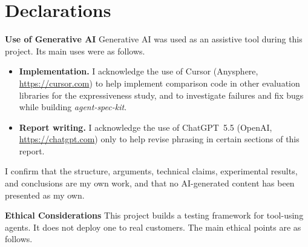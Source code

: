 \chapter{Declarations}

\noindent\textbf{Use of Generative AI}
Generative AI was used as an assistive tool during this project. Its main uses were as follows.

\begin{itemize}
    \item \textbf{Implementation.} I acknowledge the use of Cursor (Anysphere, \url{https://cursor.com}) to help implement comparison code in other evaluation libraries for the expressiveness study, and to investigate failures and fix bugs while building \emph{agent-spec-kit}.

    \item \textbf{Report writing.} I acknowledge the use of ChatGPT~5.5 (OpenAI, \url{https://chatgpt.com}) only to help revise phrasing in certain sections of this report.
\end{itemize}

\noindent I confirm that the structure, arguments, technical claims, experimental results, and conclusions are my own work, and that no AI-generated content has been presented as my own.

\medskip
\noindent\textbf{Ethical Considerations}
This project builds a testing framework for tool-using agents. It does not deploy one to real customers. The main ethical points are as follows.

